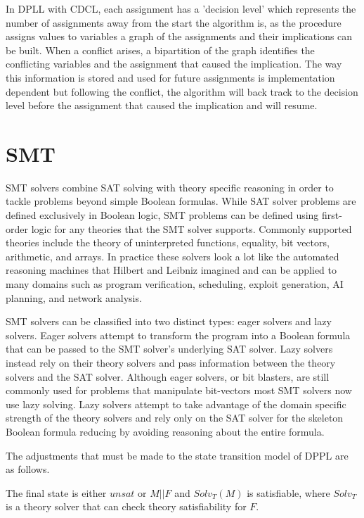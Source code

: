 \documentclass[]{final_report}
\begin{document}
In DPLL with CDCL, each assignment has a 'decision level' which represents the number of assignments away from the start the algorithm is, as the procedure assigns values to variables a graph of the assignments and their implications can be built. When a conflict arises, a bipartition of the graph identifies the conflicting variables and the assignment that caused the implication. The way this information is stored and used for future assignments is implementation dependent but following the conflict, the algorithm will back track to the decision level before the assignment that caused the implication and will resume.

\section{SMT}

SMT solvers combine SAT solving with theory specific reasoning in order to tackle problems beyond simple Boolean formulas. While SAT solver problems are defined exclusively in Boolean logic, SMT problems can be defined using first-order logic for any theories that the SMT solver supports. Commonly supported theories include the theory of uninterpreted functions, equality, bit vectors,  arithmetic, and arrays. In practice these solvers look a lot like the automated reasoning machines that Hilbert and Leibniz imagined and can be applied to many domains such as program verification, scheduling, exploit generation, AI planning, and network analysis.

SMT solvers can be classified into two distinct types: eager solvers and lazy solvers. Eager solvers attempt to transform the program into a Boolean formula that can be passed to the SMT solver's underlying SAT solver. Lazy solvers instead rely on their theory solvers and pass information between the theory solvers and the SAT solver. Although eager solvers, or bit blasters, are still commonly used for problems that manipulate bit-vectors most SMT solvers now use lazy solving. Lazy solvers attempt to take advantage of the domain specific strength of the theory solvers and rely only on the SAT solver for the skeleton Boolean formula reducing by avoiding reasoning about the entire formula. 

The adjustments that must be made to the state transition model of DPPL are as follows. 

The final state is either $unsat$ or $M || F$ and $Solv _T(M)$ is satisfiable, where $Solv_T$ is a theory solver that can check theory satisfiability for $F$.
\end{document}
